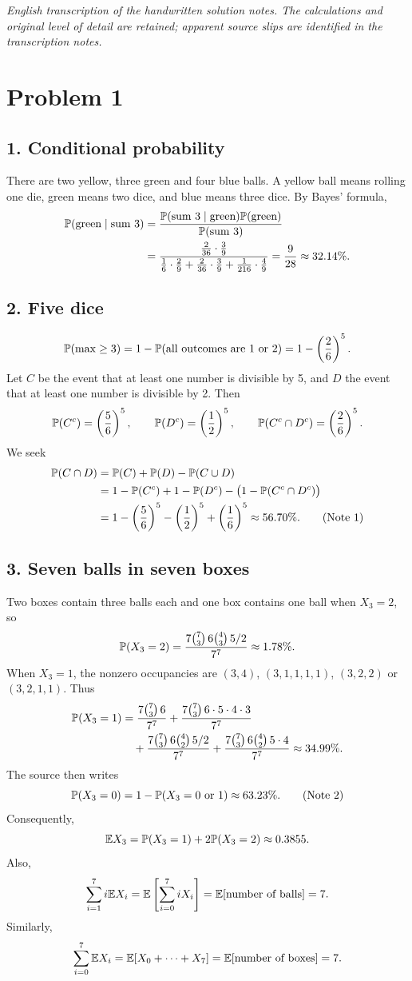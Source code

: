 \documentclass[11pt,a4paper]{article}
\begin{document}
\noindent\emph{English transcription of the handwritten solution notes. The calculations and original level of detail are retained; apparent source slips are identified in the transcription notes.}

\section*{Problem 1}
\subsection*{1. Conditional probability}
There are two yellow, three green and four blue balls. A yellow ball means rolling one die, green means two dice, and blue means three dice. By Bayes' formula,
\begin{align*}
\P(\text{green}\mid\text{sum }3)
&=\frac{\P(\text{sum }3\mid\text{green})\P(\text{green})}{\P(\text{sum }3)}\\
&=\frac{\frac2{36}\cdot\frac39}
{\frac16\cdot\frac29+\frac2{36}\cdot\frac39+\frac1{216}\cdot\frac49}
=\frac9{28}\approx32.14\%.
\end{align*}
\subsection*{2. Five dice}
\[
\P(\max\ge3)=1-\P(\text{all outcomes are 1 or 2})=1-\left(\frac26\right)^5.
\]
Let $C$ be the event that at least one number is divisible by 5, and $D$ the event that at least one number is divisible by 2. Then
\[
\P(C^c)=\left(\frac56\right)^5,\qquad
\P(D^c)=\left(\frac12\right)^5,\qquad
\P(C^c\cap D^c)=\left(\frac26\right)^5.
\]
We seek
\begin{align*}
\P(C\cap D)&=\P(C)+\P(D)-\P(C\cup D)\\
&=1-\P(C^c)+1-\P(D^c)-\bigl(1-\P(C^c\cap D^c)\bigr)\\
&=1-\left(\frac56\right)^5-\left(\frac12\right)^5
+\left(\frac16\right)^5\approx56.70\%.\tag{Note 1}
\end{align*}
\subsection*{3. Seven balls in seven boxes}
Two boxes contain three balls each and one box contains one ball when $X_3=2$, so
\[
\P(X_3=2)=\frac{7\binom73\,6\binom43\,5/2}{7^7}\approx1.78\%.
\]
When $X_3=1$, the nonzero occupancies are $(3,4)$, $(3,1,1,1,1)$, $(3,2,2)$ or $(3,2,1,1)$. Thus
\begin{align*}
\P(X_3=1)&=\frac{7\binom73\,6}{7^7}
+\frac{7\binom73\,6\cdot5\cdot4\cdot3}{7^7}\\
&\quad+\frac{7\binom73\,6\binom42\,5/2}{7^7}
+\frac{7\binom73\,6\binom42\,5\cdot4}{7^7}
\approx34.99\%.
\end{align*}
The source then writes
\[
\P(X_3=0)=1-\P(X_3=0\text{ or }1)\approx63.23\%.\tag{Note 2}
\]
Consequently,
\[
\E X_3=\P(X_3=1)+2\P(X_3=2)\approx0.3855.
\]
Also,
\[
\sum_{i=1}^7i\E X_i=\E\left[\sum_{i=0}^7iX_i\right]
=\E[\text{number of balls}]=7.
\]
Similarly,
\[
\sum_{i=0}^7\E X_i=\E[X_0+\cdots+X_7]
=\E[\text{number of boxes}]=7.
\]
\end{document}
